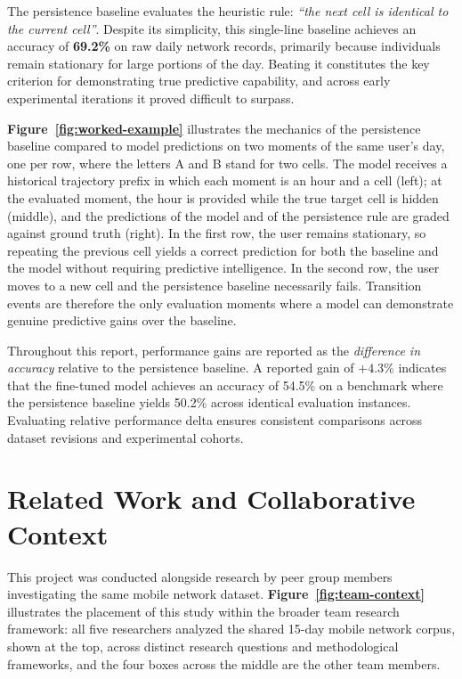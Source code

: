 The persistence baseline evaluates the heuristic rule: \emph{``the next cell is identical to the current cell''}. Despite its simplicity, this single-line baseline achieves an accuracy of \textbf{69.2\%} on raw daily network records, primarily because individuals remain stationary for large portions of the day. Beating it constitutes the key criterion for demonstrating true predictive capability, and across early experimental iterations it proved difficult to surpass.



\textbf{Figure~\ref{fig:worked-example}} illustrates the mechanics of the persistence baseline compared to model predictions on two moments of the same user's day, one per row, where the letters A and B stand for two cells. The model receives a historical trajectory prefix in which each moment is an hour and a cell (left); at the evaluated moment, the hour is provided while the true target cell is hidden (middle), and the predictions of the model and of the persistence rule are graded against ground truth (right). In the first row, the user remains stationary, so repeating the previous cell yields a correct prediction for both the baseline and the model without requiring predictive intelligence. In the second row, the user moves to a new cell and the persistence baseline necessarily fails. Transition events are therefore the only evaluation moments where a model can demonstrate genuine predictive gains over the baseline.

Throughout this report, performance gains are reported as the \emph{difference in accuracy} relative to the persistence baseline. A reported gain of $+4.3\%$ indicates that the fine-tuned model achieves an accuracy of 54.5\% on a benchmark where the persistence baseline yields 50.2\% across identical evaluation instances. Evaluating relative performance delta ensures consistent comparisons across dataset revisions and experimental cohorts.

\section{Related Work and Collaborative Context}

This project was conducted alongside research by peer group members investigating the same mobile network dataset. \textbf{Figure~\ref{fig:team-context}} illustrates the placement of this study within the broader team research framework: all five researchers analyzed the shared 15-day mobile network corpus, shown at the top, across distinct research questions and methodological frameworks, and the four boxes across the middle are the other team members.

